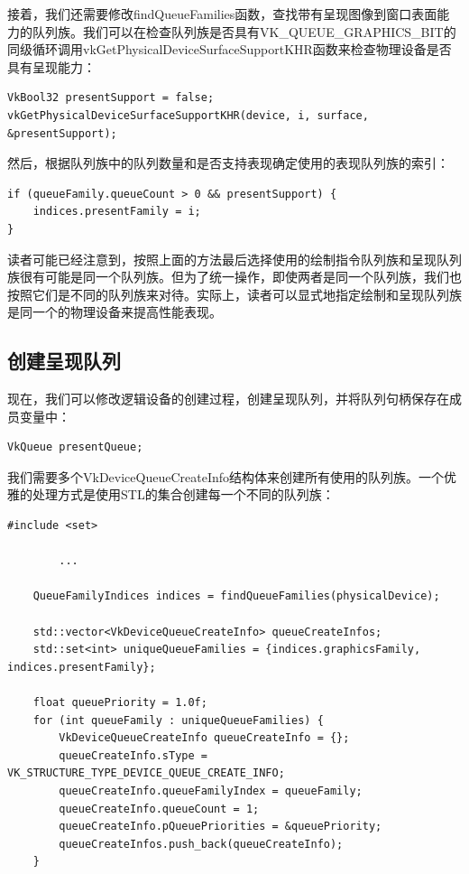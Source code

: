 \documentclass{ctexart}
\begin{document}
接着，我们还需要修改findQueueFamilies函数，查找带有呈现图像到窗口表面能力的队列族。我们可以在检查队列族是否具有VK\_QUEUE\_GRAPHICS\_BIT的同级循环调用vkGetPhysicalDeviceSurfaceSupportKHR函数来检查物理设备是否具有呈现能力：

\begin{lstlisting}[language={[ANSI]C}]
VkBool32 presentSupport = false;
vkGetPhysicalDeviceSurfaceSupportKHR(device, i, surface, &presentSupport);
\end{lstlisting}

然后，根据队列族中的队列数量和是否支持表现确定使用的表现队列族的索引：

\begin{lstlisting}[language={[ANSI]C}]
if (queueFamily.queueCount > 0 && presentSupport) {
	indices.presentFamily = i;
}
\end{lstlisting}

读者可能已经注意到，按照上面的方法最后选择使用的绘制指令队列族和呈现队列族很有可能是同一个队列族。但为了统一操作，即使两者是同一个队列族，我们也按照它们是不同的队列族来对待。实际上，读者可以显式地指定绘制和呈现队列族是同一个的物理设备来提高性能表现。

\subsection{创建呈现队列}

现在，我们可以修改逻辑设备的创建过程，创建呈现队列，并将队列句柄保存在成员变量中：

\begin{lstlisting}[language={[ANSI]C}]
VkQueue presentQueue;
\end{lstlisting}

我们需要多个VkDeviceQueueCreateInfo结构体来创建所有使用的队列族。一个优雅的处理方式是使用STL的集合创建每一个不同的队列族：

\begin{lstlisting}[language={[ANSI]C}]
#include <set>

		...

	QueueFamilyIndices indices = findQueueFamilies(physicalDevice);

	std::vector<VkDeviceQueueCreateInfo> queueCreateInfos;
	std::set<int> uniqueQueueFamilies = {indices.graphicsFamily, indices.presentFamily};

	float queuePriority = 1.0f;
	for (int queueFamily : uniqueQueueFamilies) {
		VkDeviceQueueCreateInfo queueCreateInfo = {};
		queueCreateInfo.sType = VK_STRUCTURE_TYPE_DEVICE_QUEUE_CREATE_INFO;
		queueCreateInfo.queueFamilyIndex = queueFamily;
		queueCreateInfo.queueCount = 1;
		queueCreateInfo.pQueuePriorities = &queuePriority;
		queueCreateInfos.push_back(queueCreateInfo);
	}
\end{lstlisting}
\end{document}
